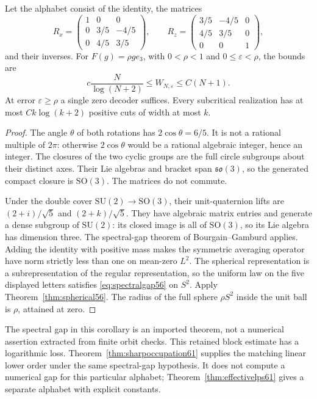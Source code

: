 \begin{corollary}\label{cor:SO356}
Let the alphabet consist of the identity, the matrices
\[
 R_x=\begin{pmatrix}1&0&0\\0&3/5&-4/5\\0&4/5&3/5\end{pmatrix},
 \qquad
 R_z=\begin{pmatrix}3/5&-4/5&0\\4/5&3/5&0\\0&0&1\end{pmatrix},
\]
and their inverses. For $F(g)=\rho g e_3$, with $0<\rho<1$ and $0\le\varepsilon<\rho$, the bounds are
\[
             c\frac{N}{\log(N+2)}\le W_{N,\varepsilon}\le C(N+1).
\]
At error $\varepsilon\ge\rho$ a single zero decoder suffices. Every subcritical realization has at most $Ck\log(k+2)$ positive cuts of width at most $k$.
\end{corollary}
\begin{proof}
The angle $\theta$ of both rotations has $2\cos\theta=6/5$. It is not a rational multiple of $2\pi$: otherwise $2\cos\theta$ would be a rational algebraic integer, hence an integer. The closures of the two cyclic groups are the full circle subgroups about their distinct axes. Their Lie algebras and bracket span $\mathfrak{so}(3)$, so the generated compact closure is $\mathrm{SO}(3)$. The matrices do not commute.

Under the double cover $\mathrm{SU}(2)\to\mathrm{SO}(3)$, their unit-quaternion lifts are $(2+i)/\sqrt5$ and $(2+k)/\sqrt5$. They have algebraic matrix entries and generate a dense subgroup of $\mathrm{SU}(2)$: its closed image is all of $\mathrm{SO}(3)$, so its Lie algebra has dimension three. The spectral-gap theorem of Bourgain--Gamburd \cite{BG2012} applies. Adding the identity with positive mass makes the symmetric averaging operator have norm strictly less than one on mean-zero $L^2$. The spherical representation is a subrepresentation of the regular representation, so the uniform law on the five displayed letters satisfies \eqref{eq:spectralgap56} on $S^2$. Apply Theorem~\ref{thm:spherical56}. The radius of the full sphere $\rho S^2$ inside the unit ball is $\rho$, attained at zero.
\end{proof}
The spectral gap in this corollary is an imported theorem, not a numerical assertion extracted from finite orbit checks. This retained block estimate has a logarithmic loss. Theorem~\ref{thm:sharpoccupation61} supplies the matching linear lower order under the same spectral-gap hypothesis. It does not compute a numerical gap for this particular alphabet; Theorem~\ref{thm:effectivelps61} gives a separate alphabet with explicit constants.
